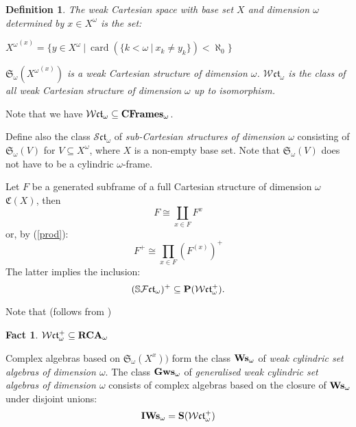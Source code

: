 \documentclass{article}
\theoremstyle{defin}
\newtheorem{definition}{Definition}
\theoremstyle{theorem}
\theoremstyle{claim}
\theoremstyle{prop}
\theoremstyle{lemma}
\theoremstyle{fact}
\newtheorem{fact}{Fact}
\theoremstyle{remark}
\theoremstyle{ex}
\theoremstyle{col}
\theoremstyle{question}
\begin{document}
\begin{definition}
The weak Cartesian space with base set $X$ and dimension $\omega$ determined by $x \in X^{\omega}$ is the set:
\begin{center}
${X^{\omega}}^{(x)} = \{ y \in X^{\omega} \: | \: \operatorname{card}(\{ k < \omega \: | \: x_k \neq y_k \}) < \aleph_0 \}$
\end{center}
$\mathfrak{S}_{\omega}({X^{\omega}}^{(x)})$ is a weak Cartesian structure of dimension $\omega$. $\mathcal{W}\mathfrak{ct}_{\omega}$ is the class of all weak Cartesian structure of dimension $\omega$ up to isomorphism.
\end{definition}
Note that we have $\mathcal{W}\mathfrak{ct}_{\omega} \subseteq {\bf CFrames}_{\omega}$.

Define also the class $\mathcal{S}\mathfrak{ct}_{\omega}$ of \emph{sub-Cartesian structures of dimension $\omega$} consisting of $\mathfrak{S}_{\omega}(V)$ for $V \subseteq X^{\omega}$, where $X$ is a non-empty base set. Note that $\mathfrak{S}_{\omega}(V)$ does not have to be a cylindric $\omega$-frame.

Let $F$ be a generated subframe of a full Cartesian structure of dimension $\omega$ $\mathfrak{C}(X)$, then
\begin{equation}
F \cong \coprod \limits_{x \in F} F^x
\end{equation}
or, by (\ref{prod}):
\begin{equation}
F^{+} \cong \prod \limits_{x \in F} (F^(x))^{+}
\end{equation}
The latter implies the inclusion:
\begin{equation}
(\mathbb{S} \mathcal{F}\mathfrak{ct}_{\omega})^+ \subseteq {\bf P} (\mathcal{W}\mathfrak{ct}_{\omega}^{+}).
\end{equation}

Note that (follows from \cite[p. 118]{henkin1981cylindric})
\begin{fact}
$\mathcal{W}\mathfrak{ct}_{\omega}^+ \subseteq {\bf RCA}_{\omega}$
\end{fact}

Complex algebras based on $\mathfrak{S}_{\omega}(X^x))$ form the class ${\bf Ws}_{\omega}$ of \emph{weak cylindric set algebras of dimension $\omega$}. The class ${\bf Gws}_{\omega}$ of \emph{generalised weak cylindric set algebras of dimension $\omega$} consists of complex algebras based on the closure of ${\bf Ws}_{\omega}$ under disjoint unions:
\begin{equation}
{\bf IWs}_{\omega} = {\bf S} (\mathcal{W}\mathfrak{ct}_{\omega}^{+})
\end{equation}
\end{document}
